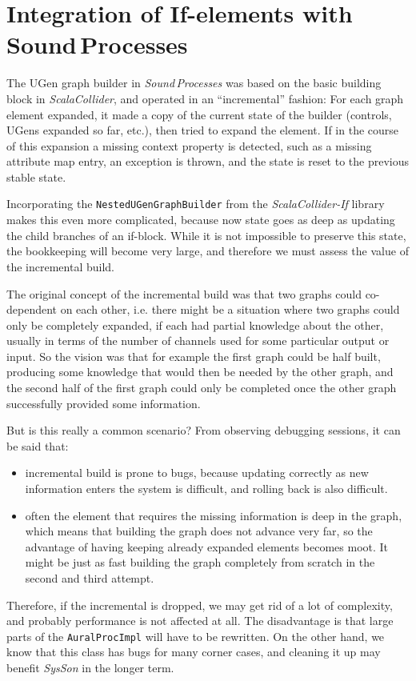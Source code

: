 \documentclass[11pt,a4paper]{article}
\newcommand{\software}[1]{\textit{#1}}
\begin{document}
\section{Integration of If-elements with Sound\,Processes}

The UGen graph builder in \software{Sound\,Processes} was based on the basic building block in \software{ScalaCollider}, and operated in an ``incremental'' fashion: For each graph element expanded, it made a copy of the current state of the builder (controls, UGens expanded so far, etc.), then tried to expand the element. If in the course of this expansion a missing context property is detected, such as a missing attribute map entry, an exception is thrown, and the state is reset to the previous stable state.

Incorporating the \Verb!NestedUGenGraphBuilder! from the \software{ScalaCollider-If} library makes this even more complicated, because now state goes as deep as updating the child branches of an if-block. While it is not impossible to preserve this state, the bookkeeping will become very large, and therefore we must assess the value of the incremental build.

The original concept of the incremental build was that two graphs could co-dependent on each other, i.e. there might be a situation where two graphs could only be completely expanded, if each had partial knowledge about the other, usually in terms of the number of channels used for some particular output or input. So the vision was that for example the first graph could be half built, producing some knowledge that would then be needed by the other graph, and the second half of the first graph could only be completed once the other graph successfully provided some information.

But is this really a common scenario? From observing debugging sessions, it can be said that:
%
\begin{itemize}
\item incremental build is prone to bugs, because updating correctly as new information enters the system is difficult, and rolling back is also difficult.
\item often the element that requires the missing information is deep in the graph, which means that building the graph does not advance very far, so the advantage of having keeping already expanded elements becomes moot. It might be just as fast building the graph completely from scratch in the second and third attempt.
\end{itemize}
%
Therefore, if the incremental is dropped, we may get rid of a lot of complexity, and probably performance is not affected at all. The disadvantage is that large parts of the \Verb!AuralProcImpl! will have to be rewritten. On the other hand, we know that this class has bugs for many corner cases, and cleaning it up may benefit \software{SysSon} in the longer term.
\end{document}
